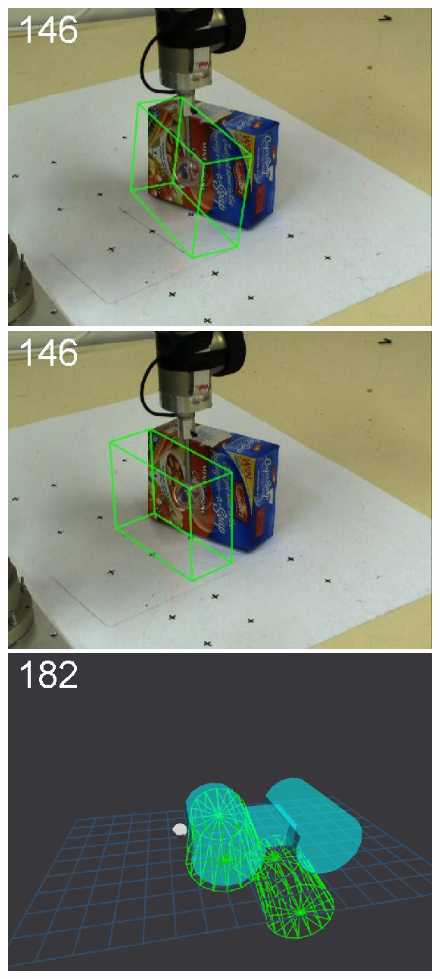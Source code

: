 \begin{figure}[tbp]
{\includegraphics[width=\imgCXwid]{images/C1_1exp_87_3}
\includegraphics[width=\imgCXwid]{images/C1_LWPR1_87_3}
\includegraphics[width=\imgCXwid]{images/C5_1exp_6_3}
}
\end{figure}

